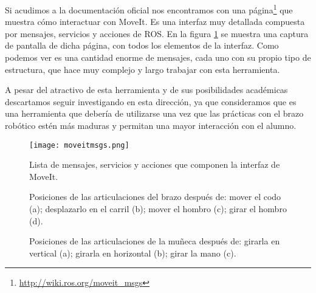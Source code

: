 Si acudimos a la documentación oficial nos encontramos con una página\footnote{\url{http://wiki.ros.org/moveit_msgs}} que muestra cómo interactuar con MoveIt. Es una interfaz muy detallada compuesta por mensajes, servicios y acciones de ROS. En la figura \ref{fig:moveitmsgs} se muestra una captura de pantalla de dicha página, con todos los elementos de la interfaz. Como podemos ver es una cantidad enorme de mensajes, cada uno con su propio tipo de estructura, que hace muy complejo y largo trabajar con esta herramienta.

A pesar del atractivo de esta herramienta y de sus posibilidades académicas descartamos seguir investigando en esta dirección, ya que consideramos que es una herramienta que debería de utilizarse una vez que las prácticas con el brazo robótico estén más maduras y permitan una mayor interacción con el alumno.

\begin{figure}[h]
	\centering
	\texttt{[image: moveitmsgs.png]}
	\caption{Lista de mensajes, servicios y acciones que componen la interfaz de MoveIt.} \label{fig:moveitmsgs}
\end{figure}


\begin{figure}[p]
	\centering
	\hspace{0.07\textwidth}	
	\hspace{0.07\textwidth}
	\caption[Ilustración de los grados de libertad del brazo]{Posiciones de las articulaciones del brazo después de: mover el codo (a); desplazarlo en el carril (b); mover el hombro (c); girar el hombro (d).} \label{fig:posicionesbrazo1}
\end{figure}


\begin{figure}[p]
	\centering
	\caption[Ilustración de los grados de libertad de la muñeca]{Posiciones de las articulaciones de la muñeca después de: girarla en vertical (a); girarla en horizontal (b); girar la mano (c).} \label{fig:posicionesbrazo2}
\end{figure}



